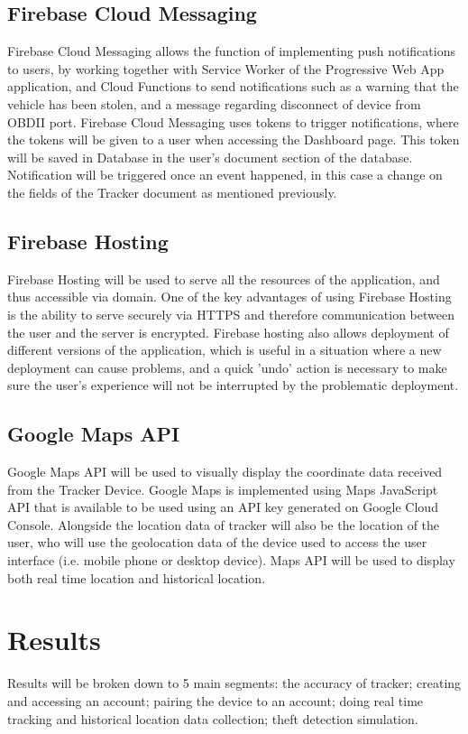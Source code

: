 \documentclass[conference]{IEEEtran}
\begin{document}
\subsection{Firebase Cloud Messaging}
Firebase Cloud Messaging allows the function of implementing push notifications to users, by working together with Service Worker of the Progressive Web App application, and Cloud Functions to send notifications such as a warning that the vehicle has been stolen, and a message regarding disconnect of device from OBDII port. 
Firebase Cloud Messaging uses tokens to trigger notifications, where the tokens will be given to a user when accessing the Dashboard page. This token will be saved in Database in the user's document section of the database. Notification will be triggered once an event happened, in this case a change on the fields of the Tracker document as mentioned previously. 

\subsection{Firebase Hosting}
Firebase Hosting will be used to serve all the resources of the application, and thus accessible via domain. One of the key advantages of using Firebase Hosting is the ability to serve securely via HTTPS and therefore communication between the user and the server is encrypted. 
Firebase hosting also allows deployment of different versions of the application, which is useful in a situation where a new deployment can cause problems, and a quick 'undo' action is necessary to make sure the user's experience will not be interrupted by the problematic deployment.

\subsection{Google Maps API}
Google Maps API will be used to visually display the coordinate data received from the Tracker Device. Google Maps is implemented using Maps JavaScript API that is available to be used using an API key generated on Google Cloud Console. Alongside the location data of tracker will also be the location 
of the user, who will use the geolocation data of the device used to access the user interface (i.e. mobile phone or desktop device). Maps API will be used to display both real time location and historical location.

\section{Results}
Results will be broken down to 5 main segments: the accuracy of tracker; creating and accessing an account; pairing the device to an account; doing real time tracking and historical location data collection; theft detection simulation. 
\end{document}
